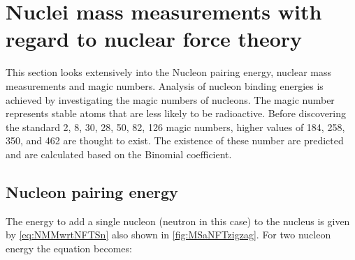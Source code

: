 \section{Nuclei mass measurements with regard to nuclear force theory}
This section looks extensively into the Nucleon pairing energy, nuclear mass measurements and magic numbers.
Analysis of nucleon binding energies is achieved by investigating the magic numbers of nucleons.
The magic number represents stable atoms that are less likely to be radioactive. 
Before discovering the standard 2, 8, 30, 28, 50, 82, 126 magic numbers, higher values of 184, 258, 350, and 462 are thought to exist. 
The existence of these number are predicted and are calculated based on the Binomial coefficient.
\subsection{Nucleon pairing energy}
The energy to add a single nucleon (neutron in this case) to the nucleus is given by \cref{eq:NMMwrtNFTSn} also shown in \cref{fig:MSaNFTzigzag}.
For two nucleon energy the equation becomes:
